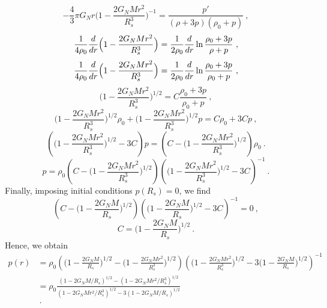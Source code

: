     \begin{equation*}
        - \frac{4}{3} \pi G_N r \Big (1 - \frac{2 G_N M r^2}{R_s^3}  \Big )^{-1} = \frac{p'}{( \rho + 3p) (\rho_0 + p)} ~,
    \end{equation*}
    \begin{equation*}
        \frac{1}{4\rho_0} \frac{d}{dr} \Big (1 - \frac{2 G_N M r^2}{R_s^3}  \Big ) = \frac{1}{2 \rho_0} \frac{d}{dr} \ln \frac{\rho_0 + 3 p}{\rho + p} ~,
    \end{equation*}
    \begin{equation*}
        \frac{1}{4\rho_0} \frac{d}{dr} \Big (1 - \frac{2 G_N M r^2}{R_s^3}  \Big ) = \frac{1}{2 \rho_0} \frac{d}{dr} \ln \frac{\rho_0 + 3 p}{\rho_0 + p} ~,
    \end{equation*}
    \begin{equation*}
        \Big (1 - \frac{2 G_N M r^2}{R_s^3}  \Big )^{1/2} = C \frac{\rho_0 + 3p}{\rho_0 + p}  ~,
    \end{equation*}
    \begin{equation*}
        \Big (1 - \frac{2 G_N M r^2}{R_s^3}  \Big )^{1/2} \rho_0 + \Big (1 - \frac{2 G_N M r^2}{R_s^3}  \Big )^{1/2} p = C \rho_0 + 3C p ~,
    \end{equation*}
    \begin{equation*}
        (\Big (1 - \frac{2 G_N M r^2}{R_s^3}  \Big )^{1/2} - 3C )p = (C - \Big (1 - \frac{2 G_N M r^2}{R_s^3}  \Big )^{1/2}) \rho_0 ~.
    \end{equation*}
    \begin{equation*}
        p = \rho_0 (C - \Big (1 - \frac{2 G_N M r^2}{R_s^3}  \Big )^{1/2}) (\Big (1 - \frac{2 G_N M r^2}{R_s^3}  \Big )^{1/2} - 3C )^{-1} ~.
    \end{equation*}
    Finally, imposing initial conditions $p(R_s) = 0$, we find
    \begin{equation*}
        (C - \Big (1 - \frac{2 G_N M}{R_s}  \Big )^{1/2}) (\Big (1 - \frac{2 G_N M}{R_s}  \Big )^{1/2} - 3C )^{-1} = 0 ~,
    \end{equation*}
    \begin{equation*}
        C = \Big (1 - \frac{2 G_N M}{R_s}  \Big )^{1/2} ~.
    \end{equation*}
    Hence, we obtain
    \begin{equation*}
    \begin{aligned}
        p (r) & = \rho_0 (\Big (1 - \frac{2 G_N M}{R_s}  \Big )^{1/2} - \Big (1 - \frac{2 G_N M r^2}{R_s^3}  \Big )^{1/2}) (\Big (1 - \frac{2 G_N M r^2}{R_s^3}  \Big )^{1/2} - 3 \Big (1 - \frac{2 G_N M}{R_s}  \Big )^{1/2})^{-1} \\ & = \rho_0 \frac{(1 - 2 G_N M/R_s )^{1/2} - (1 - 2 G_N M r^2/R_s^3 )^{1/2}}{(1 - 2 G_N M r^2/R_s^3 )^{1/2} - 3 (1 - 2 G_N M/R_s )^{1/2}} \\ &~.
    \end{aligned}
    \end{equation*}

